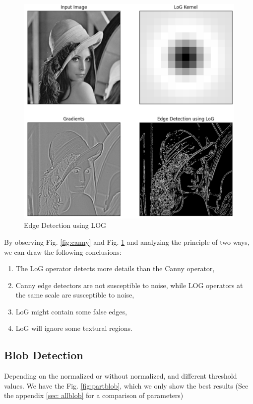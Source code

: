\documentclass[final]{cvpr}
\begin{document}
\begin{figure}[htbp]
\centering

\includegraphics[width=0.7\linewidth]{11.png}

\caption{Edge Detection using LOG}
\label{fig: log}
\end{figure}

By observing Fig. \ref{fig:canny} and Fig. \ref{fig: log} and analyzing the principle of two ways, we can draw the following conclusions:

\begin{enumerate}
\item The LoG operator detects more details than the Canny operator,
\item Canny edge detectors are not susceptible to noise, while LOG operators at the same scale are susceptible to noise,
\item LoG might contain some false edges,
\item LoG will ignore some textural regions.
\end{enumerate}

\subsection{Blob Detection}
Depending on the normalized or without normalized, and different threshold values. We have the Fig. \ref{fig:partblob}, which we only show the best results (See the appendix \ref{sec: allblob} for a comparison of parameters)
\end{document}
